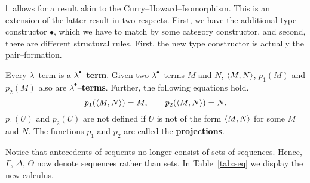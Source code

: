 $\mathsf{L}$ allows for a result akin to the
Curry--Howard--Isomorphism. This is an extension of the latter
result in two respects. First, we have the additional type
constructor $\bullet$, which we have to match by some category
constructor, and second, there are different structural rules.
First, the new type constructor is actually the pair--formation.
\begin{defn}
Every $\lambda$--term is a $\lambda^{\bullet}$--\textbf{term}.
Given two $\lambda^{\bullet}$--terms $M$ and $N$, $\langle M, N\rangle$, $p_1(M)$ 
and $p_2(M)$ also are $\lambda^{\bullet}$--\textbf{terms}.
Further, the following equations hold.
\begin{equation}
p_1(\langle M, N\rangle) = M, \qquad p_2(\langle M,N\rangle) = N.
\end{equation}
$p_1(U)$ and $p_2(U)$ are not defined if $U$ is not of the
form $\langle M, N\rangle$ for some $M$ and $N$. The functions $p_1$
and $p_2$ are called the \textbf{projections}.
\end{defn}
Notice that antecedents of sequents no longer consist of sets of
sequences. Hence, $\Gamma$, $\Delta$, $\Theta$ now denote
sequences rather than sets. In Table~\ref{tab:seq} we display the
new calculus.

